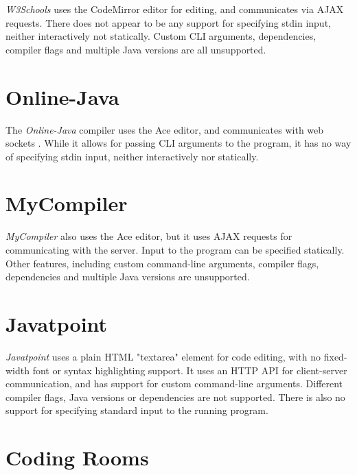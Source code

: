 \emph{W3Schools} \cite{w3schools-2022} uses the CodeMirror editor for editing, and communicates via AJAX requests. There does not appear to be any support for specifying stdin input, neither interactively not statically. Custom CLI arguments, dependencies, compiler flags and multiple Java versions are all unsupported.


\section{Online-Java}

The \emph{Online-Java} compiler uses the Ace editor, and communicates with web sockets \cite{online-ide-2022}. While it allows for passing CLI arguments to the program, it has no way of specifying stdin input, neither interactively nor statically.


\section{MyCompiler}

\emph{MyCompiler} \cite{mycompiler-2022} also uses the Ace editor, but it uses AJAX requests for communicating with the server. Input to the program can be specified statically. Other features, including custom command-line arguments, compiler flags, dependencies and multiple Java versions are unsupported.


\section{Javatpoint}

\emph{Javatpoint} \cite{javatpoint-2022} uses a plain HTML "textarea" element for code editing, with no fixed-width font or syntax highlighting support. It uses an HTTP API for client-server communication, and has support for custom command-line arguments. Different compiler flags, Java versions or dependencies are not supported. There is also no support for specifying standard input to the running program.


\section{Coding Rooms}


